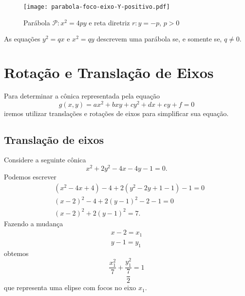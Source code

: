 \begin{figure}[!h]%
  \centering
  \caption{Par\'abola $\mathcal{P}: x^2 = 4py$ e reta diretriz $r: y = -p$, $p > 0$}
  \texttt{[image: parabola-foco-eixo-Y-positivo.pdf]}
\end{figure}

\begin{proposicao}
  As equa\c{c}\~oes $y^2 = qx$ e $x^2 = qy$ descrevem uma par\'abola se, e somente se, $q \ne 0$.
\end{proposicao}

\section{Rota\c{c}\~ao e Transla\c{c}\~ao de Eixos} %
\label{sec:rotacao_e_translacao_de_eixos}


Para determinar a c\^onica representada pela equa\c{c}\~ao
\[
  g(x, y) = ax^2 + bxy + cy^2 + dx + ey + f = 0
\]
iremos utilizar transla\c{c}\~oes e rota\c{c}\~oes de eixos para simplificar sua equa\c{c}\~ao.

\subsection{Transla\c{c}\~ao de eixos} %
\label{sub:translacaoo_de_eixos}
Considere a seguinte c\^onica
\begin{equation}\label{conicaexemplo}
  x^2 + 2y^2 - 4x - 4y - 1 = 0.
\end{equation}
Podemos escrever
\begin{align*}
  &(x^2 - 4x + 4) - 4 + 2(y^2 - 2y + 1 - 1) - 1 = 0\\
  &(x - 2)^2 - 4 + 2(y - 1)^2 - 2 - 1 = 0\\
  &(x - 2)^2 + 2(y - 1)^2 = 7.
\end{align*}
Fazendo a mudan\c{c}a
\begin{align}
  x - 2 = x_1\label{mudancaX}\\
  y - 1 = y_1\label{mudancaY}
\end{align}
obtemos
\[
  \dfrac{x_1^2}{7} + \dfrac{y_1^2}{\dfrac{7}{2}} = 1
\]
que representa uma elipse com focos no eixo $x_1$.

